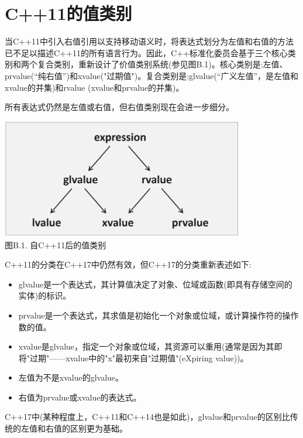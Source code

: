 \section{C++11的值类别}

当C++11中引入右值引用以支持移动语义时，将表达式划分为左值和右值的方法已不足以描述C++11的所有语言行为。因此，C++标准化委员会基于三个核心类别和两个复合类别，重新设计了价值类别系统(参见图B.1)。核心类别是:左值、prvalue(“纯右值”)和xvalue("过期值")。复合类别是:glvalue(“广义左值”，是左值和xvalue的并集)和rvalue (xvalue和prvalue的并集)。

所有表达式仍然是左值或右值，但右值类别现在会进一步细分。

\begin{center}
\includegraphics[width=0.8\textwidth]{backmatter/Appendix/B/images/1.png} \\
图B.1. 自C++11后的值类别
\end{center}

C++11的分类在C++17中仍然有效，但C++17的分类重新表述如下:

\begin{itemize}
\item 
glvalue是一个表达式，其计算值决定了对象、位域或函数(即具有存储空间的实体)的标识。

\item 
prvalue是一个表达式，其求值是初始化一个对象或位域，或计算操作符的操作数的值。

\item 
xvalue是glvalue，指定一个对象或位域，其资源可以重用(通常是因为其即将"过期"——xvalue中的"x"最初来自"过期值"(eXpiring value))。

\item 
左值为不是xvalue的glvalue。

\item 
右值为prvalue或xvalue的表达式。
\end{itemize}

C++17中(某种程度上，C++11和C++14也是如此)，glvalue和prvalue的区别比传统的左值和右值的区别更为基础。

